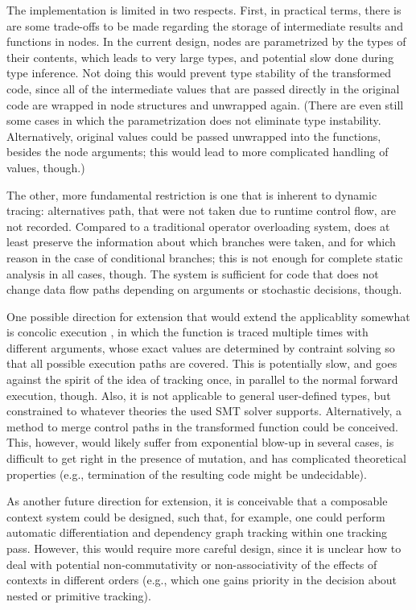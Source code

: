 The implementation is limited in two respects.  First, in practical terms, there is are some
trade-offs to be made regarding the storage of intermediate results and functions in nodes.  In the
current design, nodes are parametrized by the types of their contents, which leads to very large
types, and potential slow done during type inference.  Not doing this would prevent type stability
of the transformed code, since all of the intermediate values that are passed directly in the
original code are wrapped in node structures and unwrapped again.  (There are even still some cases
in which the parametrization does not eliminate type instability.  Alternatively, original values
could be passed unwrapped into the  functions, besides the node arguments; this
would lead to more complicated handling of values, though.)

The other, more fundamental restriction is one that is inherent to dynamic tracing: alternatives
path, that were not taken due to runtime control flow, are not recorded.  Compared to a traditional
operator overloading system, \irtrackerjl{} does at least preserve the information about which
branches were taken, and for which reason in the case of conditional branches; this is not enough
for complete static analysis in all cases, though.  The system is sufficient for code that does not
change data flow paths depending on arguments or stochastic decisions, though.

One possible direction for extension that would extend the applicablity somewhat is concolic
execution \parencite{zeller2019concolic}, in which the function is traced multiple times with
different arguments, whose exact values are determined by contraint solving so that all possible
execution paths are covered.  This is potentially slow, and goes against the spirit of the idea of
tracking once, in parallel to the normal forward execution, though.  Also, it is not applicable to
general user-defined types, but constrained to whatever theories the used SMT solver supports.
Alternatively, a method to merge control paths in the transformed function could be conceived.
This, however, would likely suffer from exponential blow-up in several cases, is difficult to get
right in the presence of mutation, and has complicated theoretical properties (e.g., termination of
the resulting code might be undecidable).

As another future direction for extension, it is conceivable that a composable context system could
be designed, such that, for example, one could perform automatic differentiation and dependency
graph tracking within one tracking pass.  However, this would require more careful design, since it
is unclear how to deal with potential non-commutativity or non-associativity of the effects of
contexts in different orders (e.g., which one gains priority in the decision about nested or
primitive tracking).


